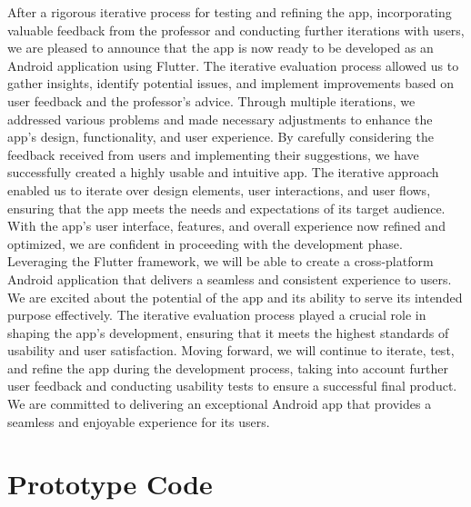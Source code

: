 \documentclass{article}
\begin{document}
After a rigorous iterative process for testing and refining the app, incorporating valuable feedback from the professor and conducting further iterations with users, we are pleased to announce that the app is now ready to be developed as an Android application using Flutter.
The iterative evaluation process allowed us to gather insights, identify potential issues, and implement improvements based on user feedback and the professor's advice. Through multiple iterations, we addressed various problems and made necessary adjustments to enhance the app's design, functionality, and user experience.
By carefully considering the feedback received from users and implementing their suggestions, we have successfully created a highly usable and intuitive app. The iterative approach enabled us to iterate over design elements, user interactions, and user flows, ensuring that the app meets the needs and expectations of its target audience. With the app's user interface, features, and overall experience now refined and optimized, we are confident in proceeding with the development phase. Leveraging the Flutter framework, we will be able to create a cross-platform Android application that delivers a seamless and consistent experience to users. We are excited about the potential of the app and its ability to serve its intended purpose effectively. The iterative evaluation process played a crucial role in shaping the app's development, ensuring that it meets the highest standards of usability and user satisfaction. Moving forward, we will continue to iterate, test, and refine the app during the development process, taking into account further user feedback and conducting usability tests to ensure a successful final product. We are committed to delivering an exceptional Android app that provides a seamless and enjoyable experience for its users.
\newpage

\section{Prototype Code}
\end{document}
